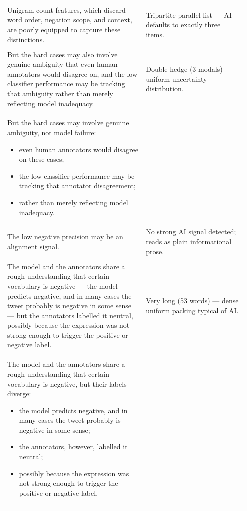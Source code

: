 \documentclass[11pt]{article}
\begin{document}
\begin{longtable}{|p{0.55\linewidth}|p{0.40\linewidth}|}
\hline
\rule{0pt}{3.5cm} & \\
\hline
Unigram count features, which discard word order, negation scope, and context, are poorly equipped to capture these distinctions. & Tripartite parallel list --- AI defaults to exactly three items. \\[2pt]
\hline
\rule{0pt}{3.5cm} & \\
\hline
But the hard cases may also involve genuine ambiguity that even human annotators would disagree on, and the low classifier performance may be tracking that ambiguity rather than merely reflecting model inadequacy. & Double hedge (3 modals) --- uniform uncertainty distribution. \\[2pt]
\hline
But the hard cases may involve genuine ambiguity, not model failure:
\begin{itemize}[leftmargin=*,topsep=2pt,itemsep=1pt,parsep=0pt]
  \item even human annotators would disagree on these cases;
  \item the low classifier performance may be tracking that annotator disagreement;
  \item rather than merely reflecting model inadequacy.
\end{itemize} & \\
\hline
The low negative precision may be an alignment signal. & No strong AI signal detected; reads as plain informational prose. \\[2pt]
\hline
\rule{0pt}{3.5cm} & \\
\hline
The model and the annotators share a rough understanding that certain vocabulary is negative --- the model predicts negative, and in many cases the tweet probably is negative in some sense --- but the annotators labelled it neutral, possibly because the expression was not strong enough to trigger the positive or negative label. & Very long (53 words) --- dense uniform packing typical of AI. \\[2pt]
\hline
The model and the annotators share a rough understanding that certain vocabulary is negative, but their labels diverge:
\begin{itemize}[leftmargin=*,topsep=2pt,itemsep=1pt,parsep=0pt]
  \item the model predicts negative, and in many cases the tweet probably is negative in some sense;
  \item the annotators, however, labelled it neutral;
  \item possibly because the expression was not strong enough to trigger the positive or negative label.

\end{itemize}
\end{longtable}
\end{document}
